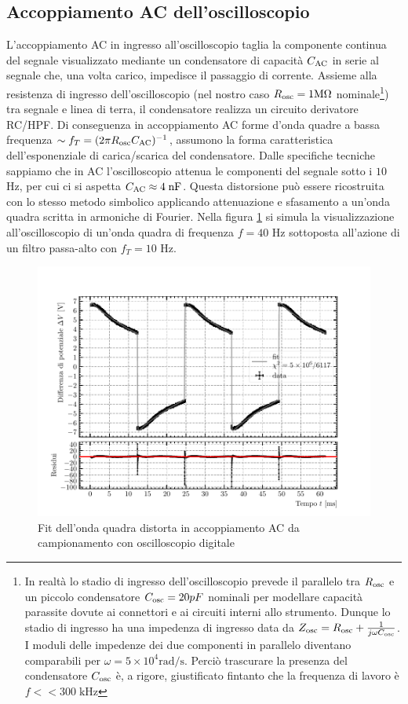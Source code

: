 \documentclass{article}[a4paper, oneside ,11pt]
\begin{document}
\subsection{Accoppiamento AC dell'oscilloscopio}
L’accoppiamento AC in ingresso all’oscilloscopio taglia la componente continua del segnale visualizzato mediante un condensatore di capacità $C_{\rm AC}$ in serie al segnale che, una volta carico, impedisce il passaggio di corrente. Assieme alla resistenza di ingresso dell’oscilloscopio (nel nostro caso $R_{\rm osc} = 1 \si{\mega\ohm}$ nominale\footnote{In realtà lo stadio di ingresso dell’oscilloscopio prevede il parallelo tra $R_{\rm osc}$ e un piccolo condensatore $C_{\rm osc} = 20 pF$ nominali per modellare capacità parassite dovute ai connettori e ai circuiti interni allo strumento. Dunque lo stadio di ingresso ha una impedenza di ingresso data da $Z_{\rm osc}= R_{\rm osc} + \frac{1}{j \omega C_{\rm osc}} $. I moduli delle impedenze dei due componenti in parallelo diventano comparabili per $\omega = 5 \times 10^4 \si{\radian\per\s}$. Perciò trascurare la presenza del condensatore $C_{\rm osc}$ è, a rigore, giustificato fintanto che la frequenza di lavoro è $f << 300 \; \si{\kilo\hertz}$}) tra segnale e linea di terra, il condensatore realizza un circuito derivatore RC/HPF. Di conseguenza in accoppiamento AC  forme d’onda quadre a bassa frequenza $\sim f_T = (2\pi R_{\rm osc}C_{\rm AC})^{-1}$, assumono la forma caratteristica dell'esponenziale di carica/scarica del condensatore. Dalle specifiche tecniche sappiamo che in AC l'oscilloscopio attenua le componenti del segnale sotto i $10$ Hz, per cui ci si aspetta $C_{\rm AC} \approx 4 \; \si{\nano\F}$. Questa distorsione può essere ricostruita con lo stesso metodo simbolico applicando attenuazione e sfasamento a un'onda quadra scritta in armoniche di Fourier. Nella figura \ref{plt:DSOAC} si simula la visualizzazione all’oscilloscopio di un’onda quadra di frequenza $f = 40$ Hz sottoposta all’azione di un filtro passa-alto con $f_T = 10$ Hz. 
\begin{figure}[!htb]
	\centering 
 		\includegraphics[scale=0.9]{./DSOAC.pdf}
 	\caption{Fit dell'onda quadra distorta in accoppiamento AC da campionamento con oscilloscopio digitale\label{plt:DSOAC}}
\end{figure}
\end{document}
